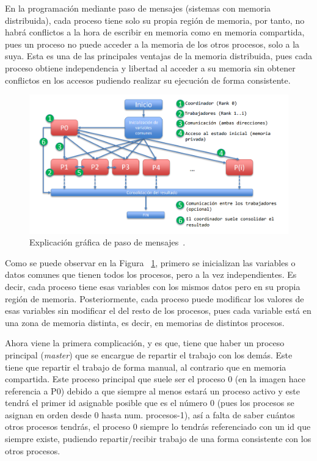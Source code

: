 \documentclass[a4paper,12pt]{article}
\begin{document}
En la programación mediante paso de mensajes (sistemas con memoria distribuida), cada proceso tiene solo su propia región de memoria, por tanto, no habrá conflictos a la hora de escribir en memoria como en memoria compartida, pues un proceso no puede acceder a la memoria de los otros procesos, solo a la suya. Esta es una de las principales ventajas de la memoria distribuida, pues cada proceso obtiene independencia y libertad al acceder a su memoria sin obtener conflictos en los accesos pudiendo realizar su ejecución de forma consistente.

\begin{figure}[htbp]
    \includegraphics[scale=0.65]{./images/2.2.arte-mpi.PNG}
    \centering
    \caption{Explicación gráfica de paso de mensajes~\cite{icmat}.}
    \label{fig:arte-mpi}
\end{figure}



Como se puede observar en la  Figura ~\ref{fig:arte-mpi}, primero se inicializan las variables o datos comunes que tienen todos los procesos, pero a la vez independientes. Es decir, cada proceso tiene esas variables con los mismos datos pero en su propia región de memoria. Posteriormente, cada proceso puede modificar los valores de esas variables sin modificar el del resto de los procesos, pues cada variable está en una zona de memoria distinta, es decir, en memorias de distintos procesos.

Ahora viene la primera complicación, y es que, tiene que haber un proceso principal ({\it master}) que se encargue de repartir el trabajo con los demás. Este tiene que repartir el trabajo de forma manual, al contrario que en memoria compartida. Este proceso principal que suele ser el proceso 0 (en la imagen hace referencia a P0) debido a que siempre al menos estará un proceso activo y este tendrá el primer id asignable posible que es el número 0 (pues los procesos se asignan en orden desde 0 hasta num. procesos-1), así a falta de saber cuántos otros procesos tendrás, el proceso 0  siempre lo tendrás referenciado con un id que siempre existe, pudiendo repartir/recibir trabajo de una forma consistente con los otros procesos.
\end{document}
